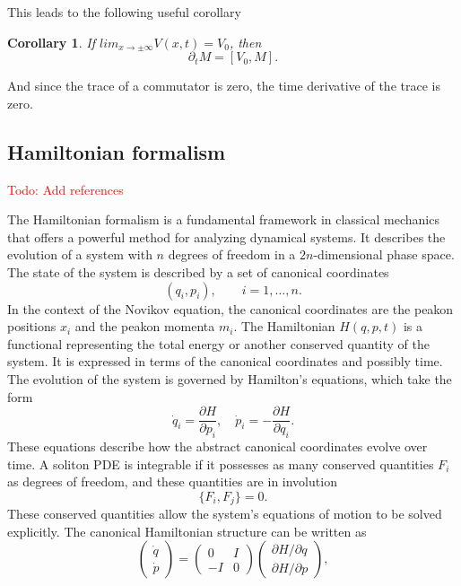 \documentclass[english,master]{liumaiex}
\theoremstyle{plain}
\newtheorem{corollary}[proposition]{Corollary}
\theoremstyle{definition}
\newcommand\todo[1]{\textcolor{red}{#1}}
\begin{document}
This leads to the following useful corollary
\begin{corollary} \label{cor:Monodromy}
	If $lim_{x \rightarrow \pm \infty} V(x,t) = V_0$, then
	\begin{equation}
		\partial_t M = [V_0, M].
	\end{equation}
\end{corollary}
And since the trace of a commutator is zero, the time derivative of the trace is zero.

\subsection{Hamiltonian formalism}
\todo{Todo: Add references}

The Hamiltonian formalism is a fundamental framework in classical mechanics that offers a powerful method for analyzing dynamical systems. It describes the evolution of a system with $n$ degrees of freedom in a $2n$-dimensional phase space. The state of the system is described by a set of canonical coordinates
\begin{equation}
	 (q_i,p_i), \qquad i = 1,\dots,n.
\end{equation}
In the context of the Novikov equation, the canonical coordinates are the peakon positions $x_i$ and the peakon momenta $m_i$. The Hamiltonian $H(q,p,t)$ is a functional representing the total energy or another conserved quantity of the system. It is expressed in terms of the canonical coordinates and possibly time. The evolution of the system is governed by Hamilton's equations, which take the form
%
\begin{equation}
	\dot{q}_i = \frac{\partial H}{\partial p_i}, \quad
	\dot{p}_i = -\frac{\partial H}{\partial q_i}.
\end{equation}
%
These equations describe how the abstract canonical coordinates evolve over time. A soliton PDE is integrable if it possesses as many conserved quantities $F_i$ as degrees of freedom, and these quantities are in involution
%
\begin{equation}
	\{F_i, F_j\} = 0.
\end{equation}
%
These conserved quantities allow the system's equations of motion to be solved explicitly. The canonical Hamiltonian structure can be written as
%
\begin{equation}
\begin{pmatrix}
	\dot{q} \\
	\dot{p}
\end{pmatrix} =
\begin{pmatrix}
	0 & I \\
	-I & 0
\end{pmatrix}
\begin{pmatrix}
	\partial H / \partial q \\
	\partial H / \partial p
\end{pmatrix},
\end{equation}
\end{document}
